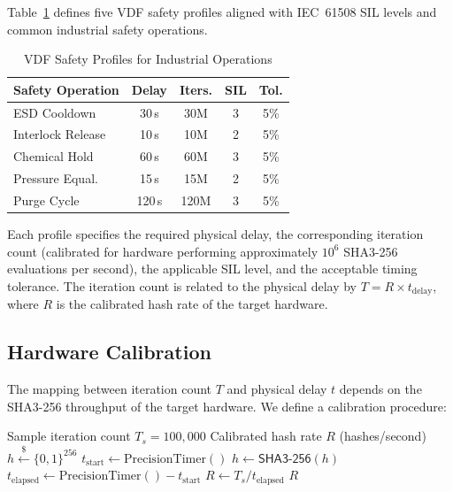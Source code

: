 \documentclass[conference,10pt]{IEEEtran}
\newcommand{\SHAthree}{\textsf{SHA3-256}}
\begin{document}
Table~\ref{tab:vdf_profiles} defines five VDF safety profiles aligned with IEC~61508 SIL levels and common industrial safety operations.

\begin{table}[t]
\centering
\caption{VDF Safety Profiles for Industrial Operations}
\label{tab:vdf_profiles}
\begin{tabular}{@{}lcccc@{}}
\toprule
\textbf{Safety Operation} & \textbf{Delay} & \textbf{Iters.} & \textbf{SIL} & \textbf{Tol.} \\
\midrule
ESD Cooldown       & 30\,s  & 30M  & 3 & 5\% \\
Interlock Release  & 10\,s  & 10M  & 2 & 5\% \\
Chemical Hold      & 60\,s  & 60M  & 3 & 5\% \\
Pressure Equal.    & 15\,s  & 15M  & 2 & 5\% \\
Purge Cycle        & 120\,s & 120M & 3 & 5\% \\
\bottomrule
\end{tabular}
\end{table}

Each profile specifies the required physical delay, the corresponding iteration count (calibrated for hardware performing approximately $10^6$ SHA3-256 evaluations per second), the applicable SIL level, and the acceptable timing tolerance. The iteration count is related to the physical delay by $T = R \times t_{\text{delay}}$, where $R$ is the calibrated hash rate of the target hardware.

\subsection{Hardware Calibration}

The mapping between iteration count $T$ and physical delay $t$ depends on the SHA3-256 throughput of the target hardware. We define a calibration procedure:

\begin{algorithm}[t]
\caption{VDF Hardware Calibration}
\label{alg:calibrate}
\begin{algorithmic}[1]
\REQUIRE Sample iteration count $T_s = 100{,}000$
\ENSURE Calibrated hash rate $R$ (hashes/second)
\STATE $h \xleftarrow{\$} \{0,1\}^{256}$
\STATE $t_{\text{start}} \gets \text{PrecisionTimer}()$
  \STATE $h \gets \SHAthree{}(h)$
\ENDFOR
\STATE $t_{\text{elapsed}} \gets \text{PrecisionTimer}() - t_{\text{start}}$
\STATE $R \gets T_s / t_{\text{elapsed}}$
\RETURN $R$
\end{algorithmic}
\end{algorithm}
\end{document}
